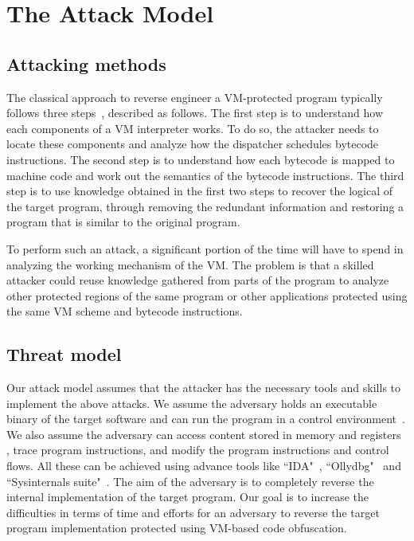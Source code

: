 \section{The Attack Model}\label{sec:attack}
\subsection{Attacking methods}
The classical approach to reverse engineer a VM-protected program typically
follows three steps~\cite{10falliere2009inside,17rolles2009unpacking}, described as follows.
The first step is to understand how each components of a VM interpreter works. 
To do so, the attacker needs to locate
these components and analyze how the dispatcher schedules bytecode instructions.
The second step is to understand how each bytecode is mapped to machine code
and work out the semantics of the bytecode instructions.
The third step is to use knowledge obtained in the first two steps to recover the
logical of the target program, through removing the redundant information
and restoring a program that is similar to the original program.


To perform such an attack, a significant portion of the time will have to spend in analyzing the working 
mechanism of the VM.
The problem is that a skilled attacker could  reuse knowledge
gathered from parts of the program to analyze other protected regions of
the same program or other applications protected using the same VM scheme and bytecode instructions.

\subsection{Threat model} 
Our attack model assumes that the attacker has the necessary tools and skills to implement the above attacks.
We assume the adversary holds an executable binary of the
target software and can run the program in a control
environment~\cite{11collberg2002watermarking}. We also assume the adversary
can access content stored in memory and registers , trace program
instructions, and modify the program instructions and control flows.
All these can be achieved using advance tools like ``IDA"~\cite{14Idapro}, ``Ollydbg"~\cite{15Ollydbg} and
``Sysinternals suite"~\cite{16Sysinternalssuite}. The aim of the adversary is
to completely reverse the internal implementation of the target program.
Our goal is to increase the difficulties in terms of time and efforts for an adversary to
reverse the target program implementation protected using VM-based code obfuscation. 